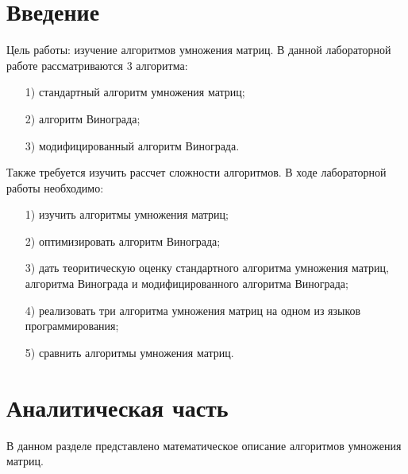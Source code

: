 \documentclass[12pt]{report}
\begin{document}
	\chapter*{Введение}
	Цель работы: изучение алгоритмов умножения матриц. В данной лабораторной работе рассматриваются 3 алгоритма:
	\begin{enumerate}
		\item[1)] стандартный алгоритм умножения матриц;
		\item[2)] алгоритм Винограда;
		\item[3)] модифицированный алгоритм Винограда.
	\end{enumerate}
	\noindent Также требуется изучить рассчет сложности алгоритмов.
	В ходе лабораторной работы необходимо:
	\begin{enumerate}
		\item[1)] изучить алгоритмы умножения матриц;
		\item[2)] оптимизировать алгоритм Винограда;
		\item[3)] дать теоритическую оценку стандартного алгоритма умножения матриц, алгоритма Винограда и модифицированного алгоритма Винограда;
		\item[4)] реализовать три алгоритма умножения матриц на одном из языков программирования;
		\item[5)] сравнить алгоритмы умножения матриц.
	\end{enumerate}
	
	\newpage
	\chapter{Аналитическая часть}
	В данном разделе представлено математическое описание алгоритмов умножения матриц.
	
\end{document}
